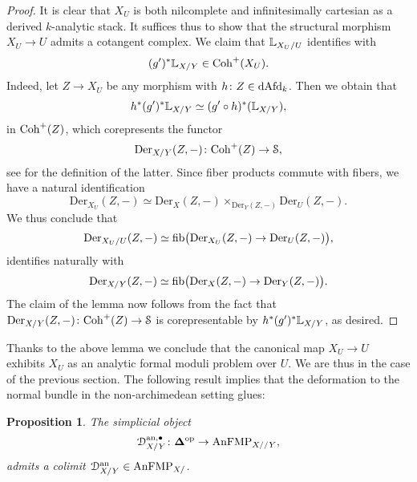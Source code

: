 \documentclass[10pt,a4paper,reqno]{amsart} %
\theoremstyle{plain}
\newtheorem{prop}[thm]{Proposition}
\theoremstyle{definition}
\theoremstyle{remark}
\numberwithin{equation}{section}
\begin{document}
\begin{proof}
    It is clear that $X_U$ is both nilcomplete and infinitesimally cartesian as a derived $k$-analytic stack. It suffices thus to show that
    the structural morphism $X_U \to U$ admits a cotangent complex. We claim that $\mathbb L_{X_U/ U}$ identifies with
        \[
            (g')^* \mathbb L_{X/ Y} \in \mathrm{Coh}^+(X_U).
        \]
    Indeed, let $Z \to X_U$ be any morphism with $h \colon Z \in \mathrm{dAfd}_k$. Then we obtain that
        \[
            h^* (g')^* \mathbb L_{X/ Y} \simeq (g' \circ h)^* (\mathbb L_{X/ Y}),  
        \]
    in $\mathrm{Coh}^+(Z)$, which corepresents the functor
        \[
            \mathrm{Der}_{X/ Y}(Z, -) \colon \mathrm{Coh}^+(Z) \to \mathcal S,  
        \]
    see \cite[Definition 7.6]{Porta_Yu_Representability} for the definition of the latter. Since fiber products commute with fibers, we have a natural identification
        \[
            \mathrm{Der}_{X_U}(Z, -) \simeq \mathrm{Der}_{X} (Z, -) \times_{\mathrm{Der}_{Y}(Z, -)} \mathrm{Der}_U(Z, -).
        \]
    We thus conclude that 
        \[
            \mathrm{Der}_{X_U/ U}(Z, -) \simeq \mathrm{fib} \big(\mathrm{Der}_{X_U}(Z, -) \to \mathrm{Der}_{U}(Z, -)\big)  ,
        \]
    identifies naturally with
        \[
            \mathrm{Der}_{X/ Y}(Z, -) \simeq \mathrm{fib} \big(\mathrm{Der}_{X}(Z, -) \to \mathrm{Der}_{Y}(Z, -)\big)  .          
        \]
    The claim of the lemma now follows from the fact that $\mathrm{Der}_{X/ Y}(Z, -) \colon \mathrm{Coh}^+(Z) \to \mathcal S$ is corepresentable
    by $h^* (g')^*\mathbb L_{X/ Y}$, as desired. 
\end{proof}

Thanks to the above lemma we conclude that the canonical map $X_U \to U$ exhibits $X_U$ as an analytic formal moduli problem
over $U$. We are thus in the case of the previous section. The following result implies that the deformation to the normal bundle in the non-archimedean
setting glues:

\begin{prop} \label{prop:gluing_def}
    The simplicial object
        \[
            \mathcal D_{X/ Y}^{\mathrm{an}, \bullet} \colon \bm{\Delta} ^\mathrm{op} \to \mathrm{AnFMP}_{X/ /Y},  
        \]
    admits a colimit $\mathcal D_{X/ Y}^\mathrm{an} \in \mathrm{AnFMP}_{X/ }$.
\end{prop}
\end{document}
